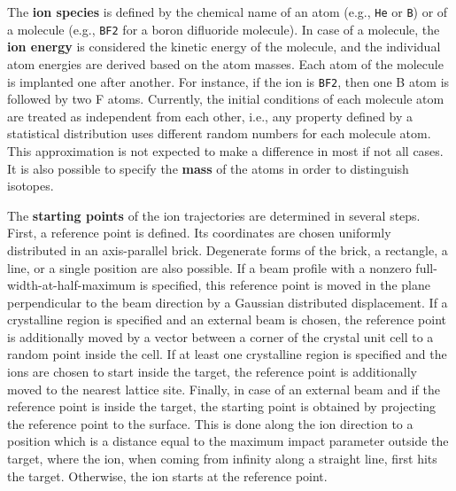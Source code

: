 The \textbf{ion species} is defined by the chemical name of an atom (e.g.,
\texttt{He} or \texttt{B}) or of a molecule (e.g., \texttt{BF2} for a
boron difluoride molecule). In case of a molecule, the \textbf{ion energy} is
considered the kinetic energy of the molecule, and the individual atom energies are
derived based on the atom masses. Each atom of the molecule is
implanted one after another. For instance, if the ion is \texttt{BF2}, then one
B atom is followed by two F atoms. Currently, the initial conditions of each 
molecule atom are treated as independent from each other, i.e., any property 
defined by a statistical distribution uses different random numbers for each 
molecule atom. This approximation is not expected to make a difference in
most if not all cases. It is also possible to specify the \textbf{mass} of the
atoms in order to distinguish isotopes.

The \textbf{starting points} of the ion trajectories are determined in several
steps. First, a reference point is defined. Its coordinates are chosen uniformly
distributed in an axis-parallel brick. Degenerate forms of the brick, a
rectangle, a line, or a single position are also possible. If a beam profile
with a nonzero full-width-at-half-maximum is specified, this reference point is
moved in the plane perpendicular to the beam direction by a Gaussian distributed
displacement. If a crystalline region is specified and an external beam is
chosen, the reference point is additionally moved by a vector between a corner
of the crystal unit cell to a random point inside the cell. If at least one
crystalline region is specified and the ions are chosen to start inside the
target, the reference point is additionally moved to the nearest lattice site. 
Finally, in case of an external beam and if the reference point is inside the
target, the starting point is obtained by projecting the reference point to the
surface. This is done along the ion direction to a position which is a
distance equal to the maximum impact parameter outside the target, where the
ion, when coming from infinity along a straight line, first hits the target.
Otherwise, the ion starts at the reference point. 

